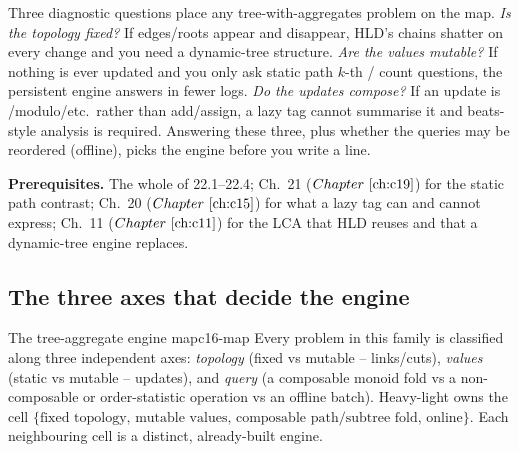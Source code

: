 \begin{topicintro}
Three diagnostic questions place any tree-with-aggregates problem on the map. \emph{Is the topology fixed?} If edges/roots appear and disappear, HLD's chains shatter on every change and you need a dynamic-tree structure. \emph{Are the values mutable?} If nothing is ever updated and you only ask static path \(k\)-th / count questions, the persistent engine answers in fewer logs. \emph{Do the updates compose?} If an update is /modulo/etc.\ rather than add/assign, a lazy tag cannot summarise it and beats-style analysis is required. Answering these three, plus whether the queries may be reordered (offline), picks the engine before you write a line.

\textbf{Prerequisites.} The whole of 22.1--22.4; Ch.~21 (\(\chref{c19}\)) for the static path contrast; Ch.~20 (\(\chref{c15}\)) for what a lazy tag can and cannot express; Ch.~11 (\(\chref{c11}\)) for the LCA that HLD reuses and that a dynamic-tree engine replaces.
\end{topicintro}

\subsection{The three axes that decide the engine}

\begin{definition}{The tree-aggregate engine map}{c16-map}
Every problem in this family is classified along three independent axes: \emph{topology} (fixed vs mutable -- links/cuts), \emph{values} (static vs mutable -- updates), and \emph{query} (a composable monoid fold vs a non-composable or order-statistic operation vs an offline batch).  Heavy-light owns the cell \(\{\text{fixed topology, mutable values, composable path/subtree fold, online}\}\).  Each neighbouring cell is a distinct, already-built engine.
\end{definition}


